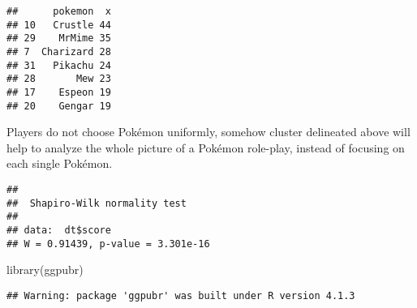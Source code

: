 \documentclass[
]{article}
\newenvironment{Shaded}{\begin{snugshade}}{\end{snugshade}}
\newcommand{\AttributeTok}[1]{\textcolor[rgb]{0.77,0.63,0.00}{#1}}
\newcommand{\DecValTok}[1]{\textcolor[rgb]{0.00,0.00,0.81}{#1}}
\newcommand{\FunctionTok}[1]{\textcolor[rgb]{0.00,0.00,0.00}{#1}}
\newcommand{\NormalTok}[1]{#1}
\newcommand{\OtherTok}[1]{\textcolor[rgb]{0.56,0.35,0.01}{#1}}
\newcommand{\SpecialCharTok}[1]{\textcolor[rgb]{0.00,0.00,0.00}{#1}}
\begin{document}
\begin{Shaded}
\end{Shaded}

\begin{verbatim}
##      pokemon  x
## 10   Crustle 44
## 29    MrMime 35
## 7  Charizard 28
## 31   Pikachu 24
## 28       Mew 23
## 17    Espeon 19
## 20    Gengar 19
\end{verbatim}

Players do not choose Pokémon uniformly, somehow cluster delineated
above will help to analyze the whole picture of a Pokémon role-play,
instead of focusing on each single Pokémon.

\begin{Shaded}
\end{Shaded}

\begin{verbatim}
## 
##  Shapiro-Wilk normality test
## 
## data:  dt$score
## W = 0.91439, p-value = 3.301e-16
\end{verbatim}

\begin{Shaded}
\begin{Highlighting}[]
\FunctionTok{library}\NormalTok{(ggpubr)}
\end{Highlighting}
\end{Shaded}

\begin{verbatim}
## Warning: package 'ggpubr' was built under R version 4.1.3
\end{verbatim}

\begin{Shaded}
\end{Shaded}
\end{document}
